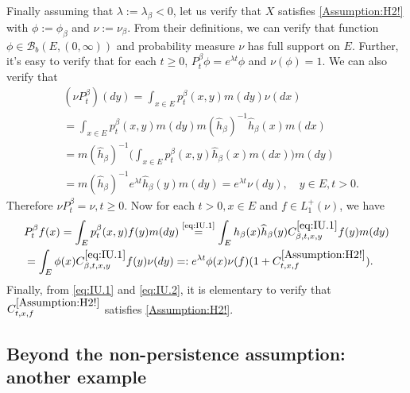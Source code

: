 \documentclass[12pt,a4paper]{amsart}
\numberwithin{equation}{section}
\theoremstyle{plain}
\theoremstyle{definition}
\theoremstyle{remark}
\newcounter{N}
\newcounter{n}[N]
\begin{document}
Finally assuming that $\lambda := \lambda_\beta < 0$, let us verify that $X$ satisfies \ref{Assumption:H2!} with $\phi:=\phi_\beta$ and $\nu:= \nu_\beta$.
From their definitions, we can verify that function $\phi \in \mathcal B_b(E,(0,\infty))$ and probability measure $\nu$ has full support on $E$.
Further, it's easy to verify that for each $t\geq 0$, $P_t^\beta \phi = e^{\lambda t}\phi$ and $\nu(\phi) = 1$.
We can also verify that
\begin{align}
&(\nu P_t^\beta)(dy) = \int_{x\in E}p_{t}^\beta(x,y)m(dy) \nu(dx)
\\&= \int_{x\in E}p_{t}^\beta(x,y)m(dy) m(\widehat h_\beta)^{-1}\widehat h_\beta(x)m(dx)
\\&=  m(\widehat h_\beta)^{-1}  \Big(\int_{x\in E} p_t^\beta(x,y) \widehat h_\beta(x) m(dx) \Big) m(dy)
\\& = m(\widehat h_\beta)^{-1} e^{\lambda t}\widehat h_\beta(y) m(dy) = e^{\lambda t}\nu(dy), \quad y \in E, t>0.
\end{align}
Therefore $\nu P_t^\beta = \nu, t\geq 0$. Now for each $t>0, x \in E$ and $f\in L_1^+(\nu)$, we have
\begin{align}
&P_t^\beta f(x) = \int_{E} p^\beta_t(x,y) f(y)m(dy)
\overset{\text{\eqref{eq:IU.1}}}= \int_{E} h_\beta (x) \widehat h_\beta (y) C^{\eqref{eq:IU.1}}_{\beta,t,x,y} f(y) m(dy)
\\&= \int_{E} \phi (x)  C^{\eqref{eq:IU.1}}_{\beta,t,x,y} f(y) \nu(dy)
=: e^{\lambda t} \phi(x) \nu(f) (1+ C^{\ref{Assumption:H2!}}_{t,x,f}).
 \end{align}
Finally, from \eqref{eq:IU.1} and \eqref{eq:IU.2}, it is elementary to verify that $C^{\ref{Assumption:H2!}}_{t,x,f}$ satisfies \ref{Assumption:H2!}.
\subsection{Beyond the non-persistence assumption: another example}
\end{document}
